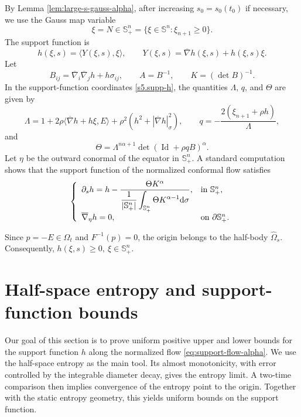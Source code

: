 \documentclass[11pt, reqno]{amsart}
\theoremstyle{remark}
\theoremstyle{definition}
\numberwithin{equation}{section}
\newcommand{\Id}{\operatorname{Id}}
\newcommand{\Sph}{\mathbb S}
\newcommand{\bd}{\partial}
\begin{document}
By Lemma \ref{lem:large-s-gauss-alpha}, after increasing $s_0=s_0(t_0)$ if necessary,
we use the Gauss map variable
\begin{equation*}
	\xi=N\in\Sph^n_+=\{\xi\in\Sph^n:\xi_{n+1}\ge0\}.
\end{equation*}
The support function is
\begin{equation}\label{s5.supp-h}
	h(\xi,s)=\langle Y(\xi,s),\xi \rangle,
	\qquad
	Y(\xi,s)=\overline{\nabla} h(\xi,s)+h(\xi,s)\xi.
\end{equation}
Let
\begin{equation*}
	B_{ij}=\overline{\nabla}_i\overline{\nabla}_j h+h\sigma_{ij},
	\qquad
	A=B^{-1},
	\qquad
	K=(\det B)^{-1}.
\end{equation*}
In the support-function coordinates \eqref{s5.supp-h}, the quantities $\Lambda$, $q$, and $\Theta$ are given by
\begin{equation}\label{s5.Dq}
	\Lambda= 1 + 2\rho \langle \overline{\nabla} h+h\xi, E \rangle + \rho^2(h^2+|\overline{\nabla} h|^2_{\sigma}),
	\qquad
	q= -\frac{2(\xi_{n+1}+\rho h)}{\Lambda},
\end{equation}
and
\begin{equation*}
	\Theta=\Lambda^{n\alpha+1}\det(\Id+\rho q B)^\alpha.
\end{equation*}
Let $\eta$ be the outward conormal of the equator in $\Sph^n_+$.  A standard computation shows that the support function of the normalized conformal flow satisfies
\begin{equation}\label{eq:support-flow-alpha}
	\left\{
	\begin{array}{ll}
		\partial_sh=h-\dfrac{\Theta K^{\alpha}}{\dfrac{1}{|\mathbb{S}_+^n|}\displaystyle\int_{\mathbb{S}_+^n}\Theta K^{\alpha-1}\mathrm{d}\sigma}, & \hbox{in }\Sph^n_+,\\
		\overline{\nabla}_\eta h=0, & \hbox{on }\bd\Sph^n_+.
	\end{array}
	\right.
\end{equation}

Since $p=-E\in \Omega_t$ and $F^{-1}(p)=0$, the origin belongs to the half-body $\widehat{\Omega}_s$.  Consequently, $h(\xi,s)\geq 0,\ \xi\in\mathbb{S}^n_+$. 


\section{Half-space entropy and support-function bounds}
\label{sec:entropy-alpha}
Our goal of this section is to prove uniform positive upper and lower bounds for the support function $h$ along the normalized flow \eqref{eq:support-flow-alpha}. We use the half-space entropy as the main tool. Its almost monotonicity, with error controlled by the integrable diameter decay, gives the entropy limit. A two-time comparison then implies convergence of the entropy point to the origin. Together with the static entropy geometry, this yields uniform bounds on the support function.
\end{document}
